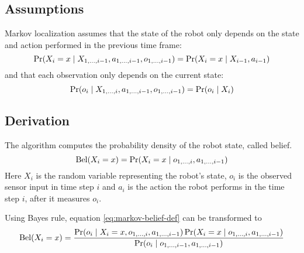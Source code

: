 \subsection{Assumptions}
\label{sec:markov-assumptions}
Markov localization assumes that the state of the robot only depends
on the state and action performed in the previous time frame:
	\begin{equation}
		\operatorname{\mathrm{Pr}}(X_i = x \mid X_{1, \dotsc, i - 1}, a_{1, \dotsc, i - 1},
		o_{1, \dotsc, i - 1}) =
		\operatorname{\mathrm{Pr}}(X_i = x \mid X_{i - 1}, a_{i - 1})
	\end{equation}
and that each observation only depends on the current state:
	\begin{equation}
		\label{eq:markov-observation-independence}
		\operatorname{\mathrm{Pr}}(o_i \mid X_{1, \dotsc, i}, a_{1, \dotsc, i - 1},
		o_{1, \dotsc, i - 1}) =
		\operatorname{\mathrm{Pr}}(o_i \mid X_i)
	\end{equation}


\subsection{Derivation}

The algorithm computes the probability density of the robot state, called belief.
\begin{equation}
	\label{eq:markov-belief-def}
	\operatorname{\mathrm{Bel}}(X_i = x) = \operatorname{\mathrm{Pr}}(X_i = x \mid o_{1, \dotsc, i}, a_{1,\dotsc,i - 1})
\end{equation}
Here \(X_i\) is the random variable representing the robot's state,
\(o_i\) is the observed sensor input in time step \(i\) and \(a_i\)
is the action the robot performs in the time step \(i\), after it
measures \(o_i\).

Using Bayes rule, equation \eqref{eq:markov-belief-def} can be transformed to
\begin{equation}
	\label{eq:markov-derivation1}
	\operatorname{\mathrm{Bel}}(X_i = x) =
	\frac{
		\operatorname{\mathrm{Pr}}(o_i \mid X_i = x, o_{1, \dotsc, i}, a_{1,\dotsc,i - 1})
		\operatorname{\mathrm{Pr}}(X_i = x \mid o_{1, \dotsc, i}, a_{1, \dotsc, i - 1})
	}{
		\operatorname{\mathrm{Pr}}(o_i \mid o_{1, \dotsc, i-1}, a_{1, \dotsc, i-1})
	}
\end{equation}

